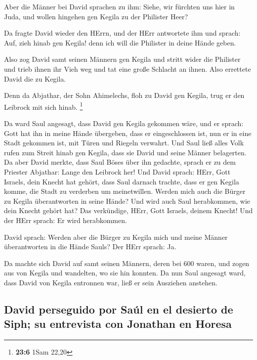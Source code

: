  Aber die Männer bei David sprachen zu ihm: Siehe, wir
fürchten uns hier in Juda, und wollen hingehen gen Kegila zu der
Philister Heer?

 Da fragte David wieder den HErrn, und der HErr antwortete
ihm und sprach: Auf, zieh hinab gen Kegila! denn ich will die Philister
in deine Hände geben.

 Also zog David samt seinen Männern gen Kegila und stritt
wider die Philister und trieb ihnen ihr Vieh weg und tat eine große
Schlacht an ihnen. Also errettete David die zu Kegila.

 Denn da Abjathar, der Sohn Ahimelechs, floh zu David gen
Kegila, trug er den Leibrock mit sich hinab. \footnote{\textbf{23:6}
  1Sam 22,20}

 Da ward Saul angesagt, dass David gen Kegila gekommen
wäre, und er sprach: Gott hat ihn in meine Hände übergeben, dass er
eingeschlossen ist, nun er in eine Stadt gekommen ist, mit Türen und
Riegeln verwahrt.  Und Saul ließ alles Volk rufen zum
Streit hinab gen Kegila, dass sie David und seine Männer belagerten.
 Da aber David merkte, dass Saul Böses über ihn gedachte,
sprach er zu dem Priester Abjathar: Lange den Leibrock her!
 Und David sprach: HErr, Gott Israels, dein Knecht hat
gehört, dass Saul darnach trachte, dass er gen Kegila komme, die Stadt
zu verderben um meinetwillen.  Werden mich auch die
Bürger zu Kegila überantworten in seine Hände? Und wird auch Saul
herabkommen, wie dein Knecht gehört hat? Das verkündige, HErr, Gott
Israels, deinem Knecht! Und der HErr sprach: Er wird herabkommen.

 David sprach: Werden aber die Bürger zu Kegila mich und
meine Männer überantworten in die Hände Sauls? Der HErr sprach: Ja.

 Da machte sich David auf samt seinen Männern, deren bei
600 waren, und zogen aus von Kegila und wandelten, wo sie hin konnten.
Da nun Saul angesagt ward, dass David von Kegila entronnen war, ließ er
sein Ausziehen anstehen.

\hypertarget{david-perseguido-por-sauxfal-en-el-desierto-de-siph-su-entrevista-con-jonathan-en-horesa}{%
\subsection{David perseguido por Saúl en el desierto de Siph; su
entrevista con Jonathan en
Horesa}\label{david-perseguido-por-sauxfal-en-el-desierto-de-siph-su-entrevista-con-jonathan-en-horesa}}


